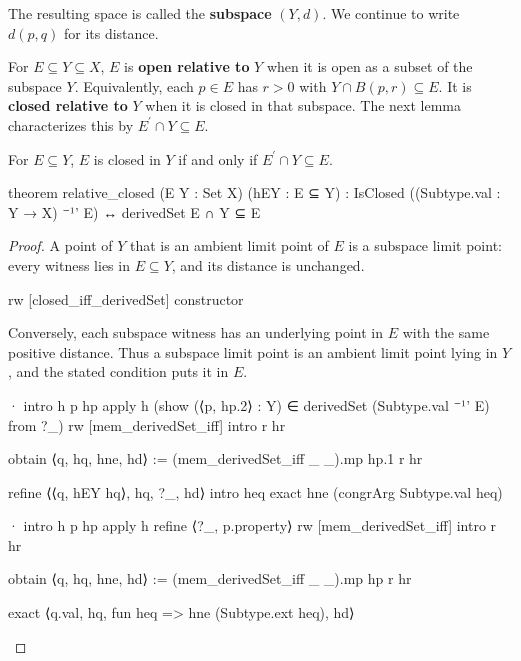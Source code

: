 The resulting space is called the \textbf{subspace} $(Y,d)$.
We continue to write $d(p,q)$ for its distance.

\begin{definition}
  \label{an1:def:relative-open-closed-sets}
  For $E\subseteq Y\subseteq X$, $E$ is \textbf{open relative to} $Y$ when it is open as a subset
  of the subspace $Y$.
  Equivalently, each $p\in E$ has $r>0$ with $Y\cap B(p,r)\subseteq E$.
  It is \textbf{closed relative to} $Y$ when it is closed in that subspace.
  The next lemma characterizes this by $E^{\prime}\cap Y\subseteq E$.
\end{definition}

\begin{lemma}
  \label{an1:lem:relative-closed}
  For $E\subseteq Y$, $E$ is closed in $Y$ if and only if $E^{\prime}\cap Y\subseteq E$.

  \begin{lean}
    theorem relative_closed (E Y : Set X) (hEY : E ⊆ Y) :
        IsClosed ((Subtype.val : Y → X) ⁻¹' E) ↔ derivedSet E ∩ Y ⊆ E
  \end{lean}
\end{lemma}

\begin{proof}
  A point of $Y$ that is an ambient limit point of $E$ is a subspace limit point: every witness
  lies in $E\subseteq Y$, and its distance is unchanged.

  \begin{lean}
    rw [closed_iff_derivedSet]
    constructor
  \end{lean}

  Conversely, each subspace witness has an underlying point in $E$ with the same positive
  distance.
  Thus a subspace limit point is an ambient limit point lying in $Y$, and the stated condition puts
  it in $E$.

  \begin{lean}
    · intro h p hp
      apply h (show (⟨p, hp.2⟩ : Y) ∈ derivedSet (Subtype.val ⁻¹' E) from ?_)
      rw [mem_derivedSet_iff]
      intro r hr

      obtain ⟨q, hq, hne, hd⟩ := (mem_derivedSet_iff _ _).mp hp.1 r hr

      refine ⟨⟨q, hEY hq⟩, hq, ?_, hd⟩
      intro heq
      exact hne (congrArg Subtype.val heq)

    · intro h p hp
      apply h
      refine ⟨?_, p.property⟩
      rw [mem_derivedSet_iff]
      intro r hr

      obtain ⟨q, hq, hne, hd⟩ := (mem_derivedSet_iff _ _).mp hp r hr

      exact ⟨q.val, hq, fun heq => hne (Subtype.ext heq), hd⟩
  \end{lean}

\end{proof}

